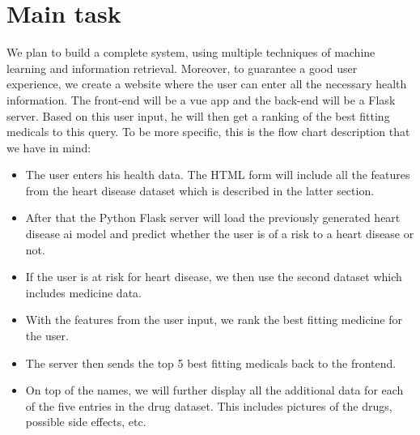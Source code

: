 \documentclass{article}
\begin{document}
\section{Main task}
We plan to build a complete system, using multiple techniques of machine learning and information retrieval. Moreover, to guarantee a good user experience, 
we create a website where the user can enter all the necessary health information. The front-end will be a vue app and the back-end will be a Flask server.
Based on this user input, he will then get a ranking of the best fitting medicals to this query.
To be more specific, this is the flow chart description that we have in mind:
\begin{itemize}
    \item The user enters his health data. The HTML form will include all the features from the heart disease dataset which is described in the latter section.
    \item After that the Python Flask server will load the previously generated heart disease ai model and predict whether the user is of a risk to a heart disease or not.
    \item If the user is at risk for heart disease, we then use the second dataset which includes medicine data.
    \item With the features from the user input, we rank the best fitting medicine for the user.
    \item The server then sends the top 5 best fitting medicals back to the frontend.
    \item On top of the names, we will further display all the additional data for each of the five entries in the drug dataset. This includes pictures of the drugs, possible side effects, etc.
\end{itemize} 

\end{document}
